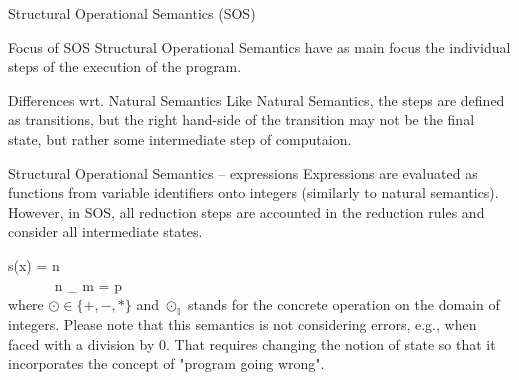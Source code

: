 \documentclass[aspectratio=169]{beamer}
\begin{document}
\begin{slide}{Structural Operational Semantics (SOS)}
\begin{block}{Focus of SOS}
Structural Operational Semantics have as main focus the individual steps of the execution of the program.
\end{block}

\begin{block}{Differences wrt. Natural Semantics}
Like Natural Semantics, the steps are defined as transitions, but the right hand-side of the transition may not be the final state, but rather some intermediate step of computaion.
\end{block}
\end{slide}

\begin{slide}{Structural Operational Semantics -- expressions}
\small 
Expressions are evaluated as functions from variable identifiers onto integers (similarly to natural semantics). However, in SOS, all reduction steps are accounted in the reduction rules and consider all intermediate states.

\centering
\newcommand{\msep}{~~~~~~}

%
  {s(x) = n}%
  { \Longrightarrow {}}
\msep %
%
  {\Longrightarrow {}}%
  { \Longrightarrow {}}
\\[5mm]
%
  { \Longrightarrow {}}%
  { \Longrightarrow {}}
\msep %
%
  {n \odot_{} m = p \in {}}%
  { \Longrightarrow {}}
\\[5mm]
\flushleft 
where $\odot \in \{+,-,*\}$ and $\odot_\mathbb{I}$ stands for the concrete operation on the domain of integers. Please note that this semantics is not considering errors, e.g., when faced with a division by 0. That requires changing the notion of state so that it incorporates the concept of "program going wrong".
\end{slide}
\end{document}
